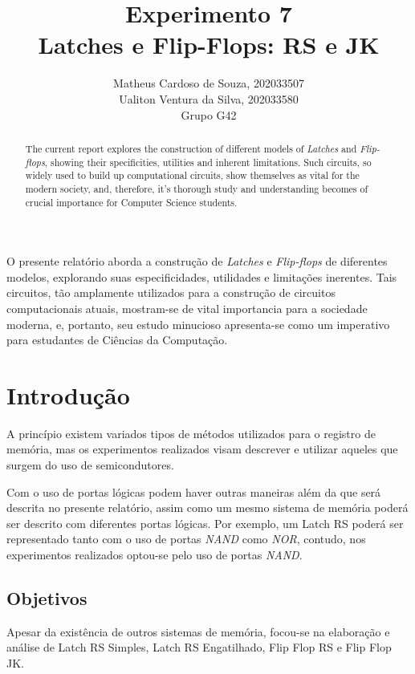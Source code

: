 \documentclass[12pt]{article}
\title{Experimento 7\\
Latches e Flip-Flops: RS e JK}
\author{Matheus Cardoso de Souza, 202033507\\
        Ualiton Ventura da Silva, 202033580\\
        Grupo G42
}
\begin{document}
\maketitle

 \begin{abstract}
   The current report explores the construction of different models of
   \emph{Latches} and \emph{Flip-flops}, showing their specificities, utilities
   and inherent limitations. Such circuits, so widely used to build up
   computational circuits, show themselves as vital for the modern society, and,
   therefore, it's thorough study and understanding becomes of crucial
   importance for Computer Science students.
 \end{abstract}

 \begin{resumo}
   O presente relatório aborda a construção de \emph{Latches} e
   \emph{Flip-flops} de diferentes modelos, explorando suas especificidades,
   utilidades e limitações inerentes. Tais circuitos, tão amplamente utilizados
   para a construção de circuitos computacionais atuais, mostram-se de vital
   importancia para a sociedade moderna, e, portanto, seu estudo minucioso
   apresenta-se como um imperativo para estudantes de Ciências da Computação.
 \end{resumo}


\section{Introdução}\label{sec:Introducao}

A princípio existem variados tipos de métodos utilizados para o registro de memória, mas os experimentos realizados visam descrever e utilizar aqueles que surgem do uso de semicondutores.

Com o uso de portas lógicas podem haver outras maneiras além da que será descrita
no presente relatório, assim como um mesmo sistema de memória poderá ser
descrito com diferentes portas lógicas. Por exemplo, um Latch RS poderá ser
representado tanto com o uso de portas \emph{NAND} como \emph{NOR}, contudo, nos
experimentos realizados optou-se pelo uso de portas \emph{NAND}.

\subsection{Objetivos}\label{sec:Objetivos}
Apesar da existência de outros sistemas de memória, focou-se na elaboração e
análise de Latch RS Simples, Latch RS Engatilhado, Flip Flop RS e Flip Flop JK.
\end{document}
